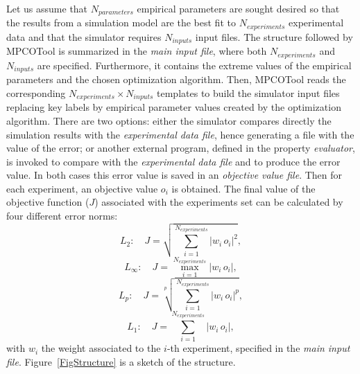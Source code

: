 \documentclass[a4paper]{report}
\newcommand{\EQ}[2]
{\begin{equation}#1\label{#2}\end{equation}}
\newcommand{\PSPICTURE}[7]
{
	\begin{figure}[ht!]
		\centering
		\pspicture(#1,#2)(#3,#4)
			#5
		\endpspicture
		\caption{#6.\label{#7}}
	\end{figure}
}
\newcommand{\ABS}[1]{\left|#1\right|}
\begin{document}
Let us assume that $N_{parameters}$ empirical parameters are sought desired so
that the results from a simulation model are the best fit to $N_{experiments}$
experimental data and that the simulator requires $N_{inputs}$ input files. The
structure followed by MPCOTool is summarized in the \emph{main input file},
where both $N_{experiments}$ and $N_{inputs}$ are specified. Furthermore, it
contains the extreme values of the empirical parameters and the chosen
optimization algorithm. Then, MPCOTool reads the corresponding
$N_{experiments}\times N_{inputs}$ templates to build the simulator input files
replacing key labels by empirical parameter values created by the optimization
algorithm. There are two options: either the simulator compares directly the
simulation results with the \emph{experimental data file}, hence generating a
file with the value of the error; or another external program, defined in the
property \emph{evaluator}, is invoked to compare with the \emph{experimental
data file} and to produce the error value. In both cases this error value is
saved in an \emph{objective value file}. Then for each experiment, an objective
value $o_i$ is obtained. The final value of the objective function ($J$)
associated with the experiments set can be calculated by four different error
norms:
\EQ{L_2:\quad J=\sqrt{\sum_{i=1}^{N_{experiments}}\ABS{w_i\,o_i}^2},}
{EqObjectiveFunctionLII}
\EQ{L_\infty:\quad J=\max_{i=1}^{N_{experiments}}\ABS{w_i\,o_i},}
{EqObjectiveFunctionLi}
\EQ{L_p:\quad J=\sqrt[p]{\sum_{i=1}^{N_{experiments}}\ABS{w_i\,o_i}^p},}
{EqObjectiveFunctionLp}
\EQ{L_1:\quad J=\sum_{i=1}^{N_{experiments}}\ABS{w_i\,o_i},}
{EqObjectiveFunctionLI}
with $w_i$ the weight associated to the $i$-th experiment, specified in the
\emph{main input file}. Figure~\ref{FigStructure} is a sketch of the
structure.
\end{document}
